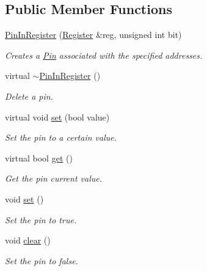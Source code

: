\subsection*{Public Member Functions}
\begin{CompactItemize}
\item 
\hyperlink{classmprace_1_1PinInRegister_a0}{Pin\-In\-Register} (\hyperlink{classmprace_1_1Register}{Register} \&reg, unsigned int bit)
\begin{CompactList}\small\item\em Creates a \hyperlink{classmprace_1_1Pin}{Pin} associated with the specified addresses. \item\end{CompactList}\item 
virtual \hyperlink{classmprace_1_1PinInRegister_a1}{$\sim$Pin\-In\-Register} ()
\begin{CompactList}\small\item\em Delete a pin. \item\end{CompactList}\item 
virtual void \hyperlink{classmprace_1_1PinInRegister_a2}{set} (bool value)
\begin{CompactList}\small\item\em Set the pin to a certain value. \item\end{CompactList}\item 
virtual bool \hyperlink{classmprace_1_1PinInRegister_a3}{get} ()
\begin{CompactList}\small\item\em Get the pin current value. \item\end{CompactList}\item 
void \hyperlink{classmprace_1_1PinInRegister_a4}{set} ()
\begin{CompactList}\small\item\em Set the pin to true. \item\end{CompactList}\item 
void \hyperlink{classmprace_1_1PinInRegister_a5}{clear} ()
\begin{CompactList}\small\item\em Set the pin to false. \item\end{CompactList}\end{CompactItemize}
